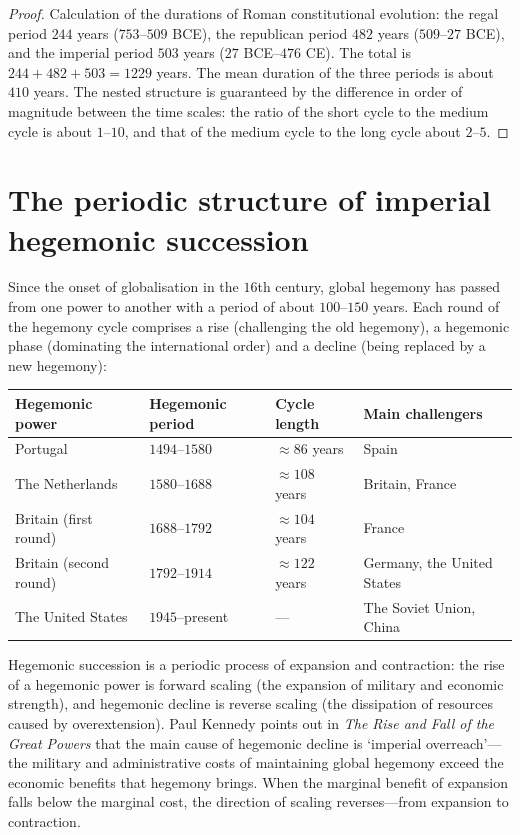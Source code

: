 \begin{proof}
Calculation of the durations of Roman constitutional evolution: the regal period $244$ years ($753$--$509$ BCE), the republican period $482$ years ($509$--$27$ BCE), and the imperial period $503$ years ($27$ BCE--$476$ CE). The total is $244+482+503=1229$ years. The mean duration of the three periods is about $410$ years. The nested structure is guaranteed by the difference in order of magnitude between the time scales: the ratio of the short cycle to the medium cycle is about $1$--$10$, and that of the medium cycle to the long cycle about $2$--$5$.
\end{proof}

\section{The periodic structure of imperial hegemonic succession}

\begin{definition}\label{def:hegemony_cycle}
Since the onset of globalisation in the $16$th century, global hegemony has passed from one power to another with a period of about $100$--$150$ years. Each round of the hegemony cycle comprises a rise (challenging the old hegemony), a hegemonic phase (dominating the international order) and a decline (being replaced by a new hegemony):
\begin{center}
\begin{tabular}{>{\centering\arraybackslash}p{2.3cm}>{\centering\arraybackslash}p{2.5cm}>{\centering\arraybackslash}p{2.5cm}>{\centering\arraybackslash}p{2.7cm}}
\toprule
Hegemonic power & Hegemonic period & Cycle length & Main challengers \\
\midrule
Portugal & $1494$--$1580$ & $\approx 86$ years & Spain \\
The Netherlands & $1580$--$1688$ & $\approx 108$ years & Britain, France \\
Britain (first round) & $1688$--$1792$ & $\approx 104$ years & France \\
Britain (second round) & $1792$--$1914$ & $\approx 122$ years & Germany, the United States \\
The United States & $1945$--present & --- & The Soviet Union, China \\
\bottomrule
\end{tabular}
\end{center}
Hegemonic succession is a periodic process of expansion and contraction: the rise of a hegemonic power is forward scaling (the expansion of military and economic strength), and hegemonic decline is reverse scaling (the dissipation of resources caused by overextension). Paul Kennedy points out in \textit{The Rise and Fall of the Great Powers} that the main cause of hegemonic decline is `imperial overreach'---the military and administrative costs of maintaining global hegemony exceed the economic benefits that hegemony brings. When the marginal benefit of expansion falls below the marginal cost, the direction of scaling reverses---from expansion to contraction.
\end{definition}


